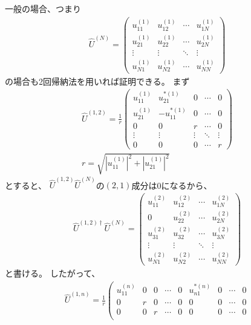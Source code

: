 \documentclass[a4paper, 10pt]{jsarticle}
\begin{document}
\begin{problem}
	一般の場合、つまり
	\begin{align}
		\hat{U}^{(N)} = \left( \begin{array}{cccc}
			u^{(1)}_{11} & u^{(1)}_{12} & \cdots & u^{(1)}_{1N} \\
			u^{(1)}_{21} & u^{(1)}_{22} & \cdots & u^{(1)}_{2N} \\
			\vdots & \vdots & \ddots & \vdots \\
			u^{(1)}_{N1} & u^{(1)}_{N2} & \cdots & u^{(1)}_{NN}
		\end{array} \right)
	\end{align}
	の場合も2回帰納法を用いれば証明できる。
	まず
	\begin{gather}
		\hat{U}^{(1,2)} = \frac{1}{r} \left( \begin{array}{ccccc}
			u^{(1)}_{11} & u^{*(1)}_{21} & 0 & \cdots &0 \\
			u^{(1)}_{21} & -u^{*(1)}_{11} & 0 & \cdots & 0 \\
			0 & 0 & r & \cdots & 0 \\
			\vdots & \vdots & \vdots & \ddots & \vdots \\
			0 & 0 & 0 & \cdots & r
		\end{array} \right) \\
		r = \sqrt{|u^{(1)}_{11}|^2 + |u^{(1)}_{21}|^2}
	\end{gather}
	とすると、
	$\hat{U}^{(1,2)} \hat{U}^{(N)}$の$(2,1)$成分は0になるから、
	\begin{align}
		\hat{U}^{(1,2)\dagger} \hat{U}^{(N)}
		= \left( \begin{array}{cccc}
			u^{(2)}_{11} & u^{(2)}_{12} & \cdots & u^{(2)}_{1N} \\
			0 & u^{(2)}_{22} & \cdots & u^{(2)}_{2N} \\
			u^{(2)}_{31} & u^{(2)}_{32} & \cdots & u^{(2)}_{3N} \\
			\vdots & \vdots & \ddots & \vdots \\
			u^{(2)}_{N1} & u^{(2)}_{N2} & \cdots & u^{(2)}_{NN}
		\end{array} \right)
	\end{align}
	と書ける。
	したがって、
	\begin{gather}
		\hat{U}^{(1,n)}
		= \frac{1}{r}
		\left( \begin{array}{ccccccccc}
			u^{(n)}_{11} & 0 & 0 & \cdots & 0 & u^{*(n)}_{n1} & 0 & \cdots &
			0 \\
			0 & r & 0 & \cdots & 0 & 0 & 0 & \cdots & 0 \\
			0 & 0 & r & \cdots & 0 & 0 & 0 & \cdots & 0 \\

\end{array}
\end{gather}
\end{problem}
\end{document}
